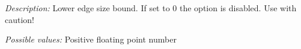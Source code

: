 \begin{itemize}[itemsep=0.8em, parsep=0.3em]
	{\it Description:} Lower edge size bound. If set to 0 the option is disabled. Use with caution!
	
	{\it Possible values:} Positive floating point number 

%	
%	
%	
%	
\end{itemize}

